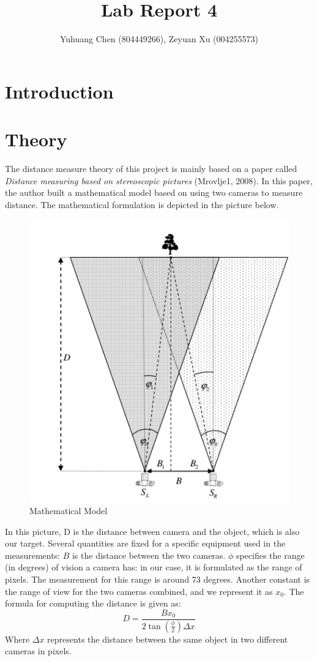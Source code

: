 \documentclass{article}
\title{Lab Report 4}
\author{Yuhuang Chen (804449266), Zeyuan Xu (004255573)}
\date{}
\begin{document}
  \maketitle%
  \thispagestyle{empty}
  
\section{Introduction}


\section{Theory}
The distance measure theory of this project is mainly based on a paper called \textit{Distance measuring based on stereoscopic pictures} (Mrovlje1, 2008). In this paper, the author built a mathematical model based on using two cameras to measure distance. The mathematical formulation is depicted in the picture below. 

\begin{figure}[h]
  \centering
  \includegraphics[width=0.5\linewidth]{theory.png}
  \caption{Mathematical Model}
  \label{fig:theory}
\end{figure}

In this picture, D is the distance between camera and the object, which is also our target. Several quantities are fixed for a specific equipment used in the measurements: $B$ is the distance between the two cameras. $\phi$ specifies the range (in degrees) of vision a camera has: in our case, it is formulated as the range of pixels. The measurement for this range is around 73 degrees. Another constant is the range of view for the two cameras combined, and we represent it as $x_0$. The formula for computing the distance is given as: 
\begin{equation}
D = \frac{B x_0}{2\tan(\frac{\phi}{2})\Delta x}
\end{equation} 
Where $\Delta x$ represents the distance between the same object in two different cameras in pixels. 
\end{document}
